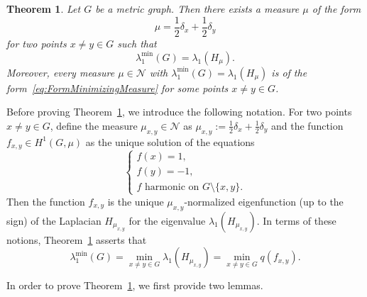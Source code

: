 \documentclass[reqno]{amsart}
\theoremstyle{plain}
\newtheorem{thm}{Theorem}[section]
\theoremstyle{definition}
\theoremstyle{remark}
\numberwithin{equation}{section}
\newcommand{\cN}{\mathcal{N}}
\begin{document}
\begin{thm} \label{thm: characerisation of lambda1}
	Let $G$ be a metric graph. Then there exists a measure $\mu$ of the form
	\begin{equation} \label{eq:FormMinimizingMeasure}
		\mu = \frac{1}{2}\delta_x + \frac{1}{2} \delta_y
	\end{equation}
	for two points $x\neq y \in G$ such that
	\[
	\lambda_1^{\min}(G) = \lambda_1(H_\mu).
	\]
	Moreover, every measure $\mu\in \cN$ with $\lambda_1^{\min}(G) = \lambda_1(H_\mu)$ is of the form~\eqref{eq:FormMinimizingMeasure} for some points $x\neq  y \in G$.
\end{thm}
Before proving Theorem~\ref{thm: characerisation of lambda1}, we introduce the following notation. For two points  $x \neq y \in G$, define the measure $\mu_{x,y} \in \cN$ as $\mu_{x,y} := \frac{1}{2}\delta_x + \frac{1}{2}\delta_y$ and the function $f_{x,y} \in H^1(G,\mu)$ as the unique solution of the equations
\begin{equation} \label{eq:Definitionfxy}
	\begin{cases}
		f(x)=1,    \\
		f(y) = -1, \\
		f \text{ harmonic}  \text{ on }G\setminus\{x,y\}.
	\end{cases}
\end{equation}
Then the function $f_{x,y}$ is the unique $\mu_{x,y}$-normalized eigenfunction (up to the sign) of the Laplacian $H_{\mu_{x,y}}$ for the eigenvalue $\lambda_1(H_{\mu_{x,y}})$. In terms of these notions, Theorem~\ref{thm: characerisation of lambda1} asserts that
\begin{equation} \label{eq:ExpressLamda1Fxy}
	\lambda_1^{\min} (G) = \min_{x \neq y \in G}  \lambda_1 (H_{\mu_{x,y}}) =\min_{x \neq y \in G} q(f_{x,y}).
\end{equation}


In order to prove Theorem~\ref{thm: characerisation of lambda1}, we first provide two lemmas.
\end{document}
